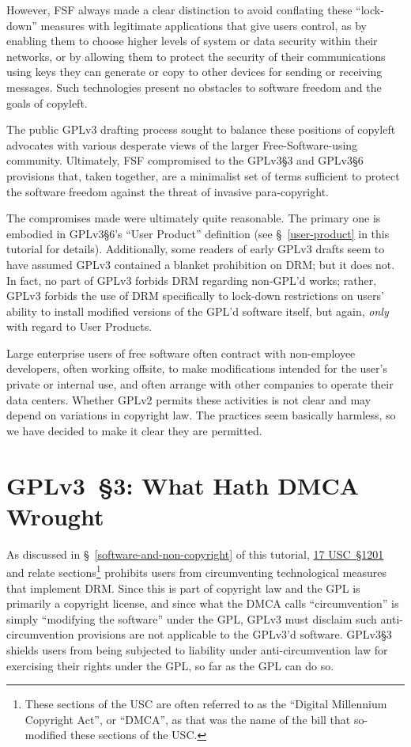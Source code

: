 However, FSF always made a clear distinction to avoid conflating these
``lock-down'' measures with legitimate applications that give users control,
as by enabling them to choose higher levels of system or data security within
their networks, or by allowing them to protect the security of their
communications using keys they can generate or copy to other devices for
sending or receiving messages.  Such technologies present no obstacles to
software freedom and the goals of copyleft.

The public GPLv3 drafting process sought to balance these positions of
copyleft advocates with various desperate views of the larger
Free-Software-using community.  Ultimately, FSF compromised to the GPLv3\S3
and GPLv3\S6 provisions that, taken together, are a minimalist set of terms
sufficient to protect the software freedom against the threat of invasive
para-copyright.

The compromises made were ultimately quite reasonable.  The primary one is
embodied in GPLv3\S6's ``User Product'' definition (see \S~\ref{user-product}
in this tutorial for details).  Additionally, some readers of early GPLv3
drafts seem to have assumed GPLv3 contained a blanket prohibition on DRM; but
it does not.  In fact, no part of GPLv3 forbids DRM regarding non-GPL'd
works; rather, GPLv3 forbids the use of DRM specifically to lock-down
restrictions on users' ability to install modified versions of the GPL'd
software itself, but again, \textit{only} with regard to User Products.

Large enterprise users of free software often contract with non-employee
developers, often working offsite, to make modifications intended for
the user's private or internal use, and often arrange with other
companies to operate their data centers.  Whether GPLv2 permits these
activities is not clear and may depend on variations in copyright law.
The practices seem basically harmless, so we have decided to make it
clear they are permitted.


\section{GPLv3~\S3: What Hath DMCA Wrought}
\label{GPLv3s3}

As discussed in \S~\ref{software-and-non-copyright} of this tutorial,
\href{http://www.law.cornell.edu/uscode/text/17/1201}{17 USC~\S1201} and
relate sections\footnote{These sections of the USC are often referred to as
  the ``Digital Millennium Copyright Act'', or ``DMCA'', as that was the name
  of the bill that so-modified these sections of the USC\@.} prohibits users
from circumventing technological measures that implement DRM\@.  Since this
is part of copyright law and the GPL is primarily a copyright license, and
since what the DMCA calls ``circumvention'' is simply ``modifying the
software'' under the GPL, GPLv3 must disclaim such anti-circumvention
provisions are not applicable to the GPLv3'd software.  GPLv3\S3 shields
users from being subjected to liability under anti-circumvention law for
exercising their rights under the GPL, so far as the GPL can do so.

